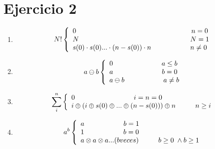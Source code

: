 \documentclass{article}
\begin{document}
\section{Ejercicio 2}
\begin{enumerate}
    \item
    \[
    N
    !\left\{
    \begin{array}{l l}
    	0 \hspace{5.9cm} n=0   \\ N \hspace{5.7cm} N=1\\   	s(0) \cdot s(0)...\cdot (n-s(0)) \cdot n  \hspace{2cm} n\neq0 \\
    \end{array}
    \right.
    \]
    \item 
    \[
    a \ominus
    b\left\{
    \begin{array}{l l}
       0 \hspace{2.5cm} a\leq b \\
       a \hspace{2.5cm} b=0 \\
       a \ominus b \hspace{2cm} a\neq b
       \end{array}
    \right.
    \]
    \item 
    \[
    \sum_{i}^{n} \left\{
    \begin{array}{l l}
    0 \hspace{3cm} i=n=0 \\
    i\oplus(i\oplus s(0)\oplus...\oplus(n-s(0)))\oplus n \hspace{1cm} n \geq i
    \end{array}
    \right.
    \]
    \item 
    \[
    a^b \left\{
    \begin{array}{l l}
    a \hspace{2cm} b=1 \\
    1 \hspace{2cm} b=0 \\
    a\otimes a \otimes a... (b veces) \hspace{1cm} b \geq0 \hspace{0.1cm} \wedge b \geq 1
    \end{array}
    \right.
    \]
\end{enumerate}
\end{document}
